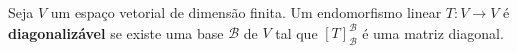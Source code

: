 \begin{definition}
	Seja $V$ um espaço vetorial de dimensão finita. Um endomorfismo linear $T\colon V\to V$ é \textbf{diagonalizável} se existe uma base $\mathcal{B}$ de $V$ tal que $[T]_{\mathcal{B}}^{\mathcal{B}}$ é uma matriz diagonal.
\end{definition}